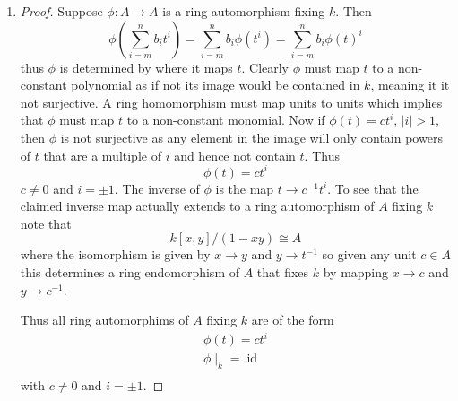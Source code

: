 \documentclass[12pt]{article}
\begin{document}
\begin{enumerate}
    \item[(iii)]
    \begin{proof}
        Suppose $\phi: A \to A$ is a ring automorphism fixing $k$. Then
        \[ \phi(\sum_{i = m}^nb_it^i) = \sum_{i = m}^nb_i\phi(t^i) = \sum_{i = m}^nb_i\phi(t)^i \]
        thus $\phi$ is determined by where it maps $t$. Clearly $\phi$ must map $t$
        to a non-constant polynomial as if not its image would be contained in $k$,
        meaning it it not surjective. A ring homomorphism must map units to units
        which implies that $\phi$ must map $t$ to a non-constant monomial. Now
        if $\phi(t) = ct^i$, $|i| > 1$, then $\phi$ is not surjective
        as any element in the image will only contain powers of $t$ that are a multiple of $i$
        and hence not contain $t$. Thus
        \[ \phi(t) = ct^i \]
        $c \neq 0$ and $i = \pm 1$. The inverse of $\phi$ is the map $t \to c^{-1}t^{i}$.
        To see that the claimed inverse map actually extends to a ring automorphism of $A$
        fixing $k$ note that
        \[ k[x, y]/(1 - xy) \cong A \]
        where the isomorphism is given by $x \to y$ and $y \to t^{-1}$ so
        given any unit $c \in A$ this determines a ring endomorphism of $A$
        that fixes $k$ by mapping $x \to c$ and $y \to c^{-1}$. 

        Thus all ring automorphims of $A$ fixing $k$ are of the form
        \begin{align*}
            \phi(t) = ct^i \\
            \phi\mid_k = \operatorname{id} \\
        \end{align*}
        with $c \neq 0$ and $i = \pm 1$.
    \end{proof}
\end{enumerate}
\end{document}
